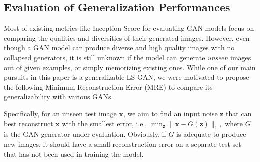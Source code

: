 \subsection{Evaluation of Generalization Performances}\label{sec:eval_gen}






Most of existing metrics like Inception Score \cite{salimans2016improved} for evaluating GAN models focus on comparing the qualities and diversities of their generated images. However, even though a GAN model can produce diverse and high quality images with no collapsed generators, it is still unknown if the model can generate {\em unseen} images out of given examples, or simply memorizing existing ones.  %
While one of our main pursuits in this paper is a generalizable LS-GAN, we were motivated to propose the following Minimum Reconstruction Error (MRE) to compare its generalizability with various GANs.




Specifically, for an unseen test image $\mathbf x$, we aim to find an input noise $\mathbf z$ that can best reconstruct $\mathbf x$ with the smallest error, i.e.,
$
\min_\mathbf z \|\mathbf x-G(\mathbf z) \|_1,
$
where $G$ is the GAN generator under evaluation. Obviously, if $G$ is adequate to produce new images, it should have a small reconstruction error on a separate test set that has not been used in training the model.



